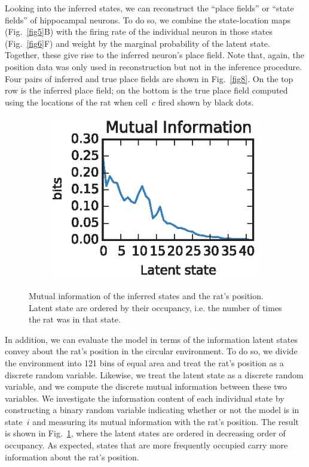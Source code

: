 Looking into the inferred states, we can reconstruct the ``place fields'' or ``state fields'' of hippocampal neurons. To do so, we combine the state-location maps (Fig.~\ref{fig5}B) with the firing rate of the individual neuron  in those states (Fig.~\ref{fig6}F) and weight by the marginal probability of the latent state. Together, these give rise to the inferred neuron's place field. Note that, again, the position data was only used in reconstruction but not in the inference procedure. Four pairs of inferred and true place fields are shown in Fig.~\ref{fig8}. On the top row is the inferred place field; on the bottom is the true place field computed using the locations of the rat when cell~$c$ fired shown by black dots.

\begin{figure}
\centering
\begin{subfigure}[t]{2.4in}
\includegraphics[width=\textwidth]{figures/ch5/Fig9}
\end{subfigure}
\caption{Mutual information of the inferred states and the rat's position. Latent state are ordered by their occupancy, i.e. the number of times the rat was in that state.  }
\label{fig9}
\end{figure}

In addition, we can evaluate the model in terms of the information latent states convey about the rat's position in the circular environment. To do so, we divide the environment into 121 bins of equal area and treat the rat's position as a discrete random variable. Likewise, we treat the latent state as a discrete random variable, and we compute the discrete mutual information between these two variables. 
We  investigate the information content of each individual state by constructing a binary random variable indicating whether or not the model is in state~$i$ and measuring its mutual information with the rat's position. The result is shown in Fig.~\ref{fig9}, where the latent states are ordered in decreasing order of occupancy. As expected, states that are more frequently occupied  carry more information about the rat's position.





